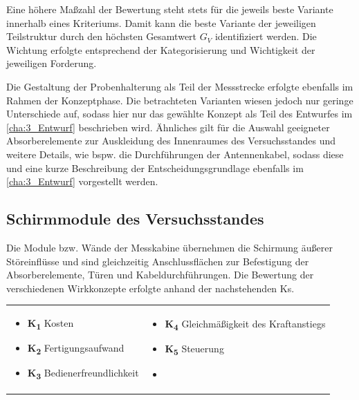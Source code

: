 Eine höhere Maßzahl der Bewertung steht stets für die jeweils beste Variante innerhalb eines Kriteriums. Damit kann die beste Variante der jeweiligen Teilstruktur durch den höchsten Gesamtwert $G_V$ identifiziert werden. Die Wichtung erfolgte entsprechend der Kategorisierung und Wichtigkeit der jeweiligen Forderung.
\par
\vspace{\linespace}
Die Gestaltung der Probenhalterung als Teil der Messstrecke erfolgte ebenfalls im Rahmen der Konzeptphase. Die betrachteten Varianten wiesen jedoch nur geringe Unterschiede auf, sodass hier nur das gewählte Konzept als Teil des Entwurfes im \Abschnitt\ref{cha:3_Entwurf} beschrieben wird. Ähnliches gilt für die Auswahl geeigneter Absorberelemente zur Auskleidung des Innenraumes des Versuchsstandes und weitere Details, wie bspw. die Durchführungen der Antennenkabel, sodass diese und eine kurze Beschreibung der Entscheidungsgrundlage ebenfalls im \Abschnitt\ref{cha:3_Entwurf} vorgestellt werden.


\subsection{Schirmmodule des Versuchsstandes}\label{cha:3_sub_Schirmmodule_Versuchsstand}

Die Module bzw. Wände der Messkabine übernehmen die Schirmung äußerer Störeinflüsse und sind gleichzeitig Anschlussflächen zur Befestigung der Absorberelemente, Türen und Kabeldurchführungen. Die Bewertung der verschiedenen Wirkkonzepte erfolgte anhand der nachstehenden \acp{K}.

\begin{tabular}{l l}
    \hspace*{1cm} \parbox[c][3cm]{7cm}{
        \begin{itemize}[]
            \item \textbf{K\textsubscript{1}} Kosten
            \item \textbf{K\textsubscript{2}} Fertigungsaufwand
            \item \textbf{K\textsubscript{3}} Bedienerfreundlichkeit
        \end{itemize}
    }&
    \parbox[c]{7cm}{
        \begin{itemize}[]
            \item \textbf{K\textsubscript{4}} Gleichmäßigkeit des Kraftanstiegs
            \item \textbf{K\textsubscript{5}} Steuerung
            \item
        \end{itemize}
    }
\end{tabular}

